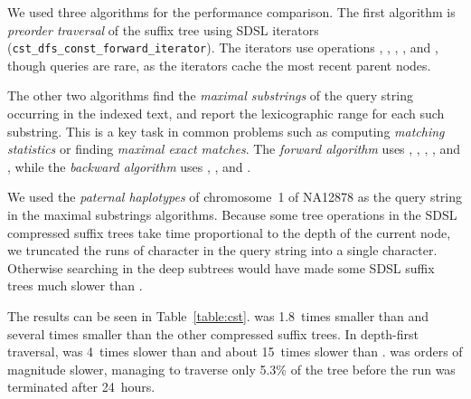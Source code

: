 We used three algorithms for the performance comparison. The first algorithm is
\emph{preorder traversal} of the suffix tree using SDSL iterators
(\texttt{cst\_dfs\_const\_forward\_iterator}). The iterators use operations
, , , , and , though 
queries are rare, as the iterators cache the most recent parent nodes.

The other two algorithms find the \emph{maximal substrings} of the query string
occurring in the indexed text, and report the lexicographic range for each such
substring. This is a key task in common problems such as computing
\emph{matching statistics} \cite{Chang1994} or finding \emph{maximal exact matches}.
The \emph{forward algorithm} uses , , , ,
and , while the \emph{backward algorithm} \cite{Ohlebusch2010a} uses
, , and .

We used the \emph{paternal haplotypes} of chromosome~1 of NA12878 as the
query string in the maximal substrings algorithms. Because some tree operations
in the SDSL compressed suffix trees take time proportional to the depth of the
current node, we truncated the runs of character  in the query string into
a single character. Otherwise searching in the deep subtrees would have
made some SDSL suffix trees much slower than \RCST.

The results can be seen in Table~\ref{table:cst}. \RCST{} was 1.8~times smaller
than \FCST{} and several times smaller than the other compressed suffix trees.
In depth-first traversal, \RCST{} was 4~times slower than \CSTnpr{} and
about 15~times slower than \CSTsada. \FCST{} was orders of magnitude slower,
managing to traverse only 5.3\% of the tree before the run was terminated after
24~hours.


